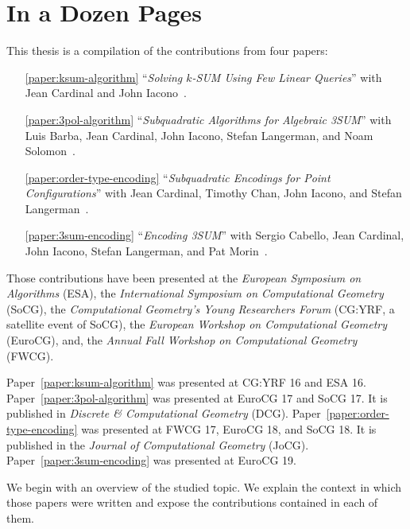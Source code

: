 \chapter{In a Dozen Pages}



This thesis is a compilation of the contributions from four papers:
%
\begin{enumerate}
	\item[\ref{paper:ksum-algorithm}] ``\emph{Solving \(k\)-SUM Using Few
		Linear Queries}''
		with Jean Cardinal and John Iacono~\cite{CIO16}.
	\item[\ref{paper:3pol-algorithm}] ``\emph{Subquadratic Algorithms for
		Algebraic 3SUM}''
		with Luis Barba, Jean Cardinal, John Iacono, Stefan Langerman, and Noam Solomon~\cite{BCILOS19}.
	\item[\ref{paper:order-type-encoding}] ``\emph{Subquadratic Encodings for
		Point Configurations}''
		with Jean Cardinal, Timothy Chan, John Iacono, and Stefan Langerman~\cite{CCILO19}.
	\item[\ref{paper:3sum-encoding}] ``\emph{Encoding 3SUM}''
		with Sergio Cabello, Jean Cardinal, John Iacono, Stefan Langerman,
		and Pat Morin~\cite{CCILMO19}.
\end{enumerate}
%
Those contributions have been presented at
the \emph{European Symposium on Algorithms} (ESA),
the \emph{International Symposium on Computational Geometry} (SoCG),
the \emph{Computational Geometry's Young Researchers Forum} (CG:YRF,
a satellite event of SoCG),
the \emph{European Workshop on Computational Geometry} (EuroCG),
and,
the \emph{Annual Fall Workshop on Computational Geometry} (FWCG).

Paper~\ref{paper:ksum-algorithm} was presented at CG:YRF 16 and ESA 16.
%
Paper~\ref{paper:3pol-algorithm} was presented at EuroCG 17 and SoCG 17.
It is published in \emph{Discrete \& Computational Geometry} (DCG).
%
Paper~\ref{paper:order-type-encoding} was presented at FWCG 17, EuroCG 18, and SoCG 18.
It is published in the \emph{Journal of Computational Geometry} (JoCG).
%
Paper~\ref{paper:3sum-encoding} was presented at EuroCG 19.

We begin with an overview of the studied topic.
%
We explain the context in which those papers were written and expose
the contributions contained in each of them.

